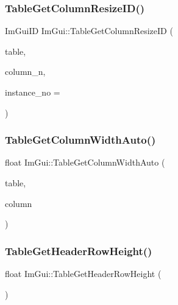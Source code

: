 \mbox{\label{namespaceImGui_afd429a61ae4e88f842031282a6430cd2}} 
\subsubsection{\texorpdfstring{Table\+Get\+Column\+Resize\+I\+D()}{TableGetColumnResizeID()}}
{\footnotesize\ttfamily Im\+Gui\+ID Im\+Gui\+::\+Table\+Get\+Column\+Resize\+ID (\begin{DoxyParamCaption}\item[{const \hyperlink{structImGuiTable}{Im\+Gui\+Table} $\ast$}]{table,  }\item[{int}]{column\+\_\+n,  }\item[{int}]{instance\+\_\+no = {} }\end{DoxyParamCaption})}

\mbox{\label{namespaceImGui_adb37a5d79b71507de590924cd53e1e62}} 
\subsubsection{\texorpdfstring{Table\+Get\+Column\+Width\+Auto()}{TableGetColumnWidthAuto()}}
{\footnotesize\ttfamily float Im\+Gui\+::\+Table\+Get\+Column\+Width\+Auto (\begin{DoxyParamCaption}\item[{\hyperlink{structImGuiTable}{Im\+Gui\+Table} $\ast$}]{table,  }\item[{\hyperlink{structImGuiTableColumn}{Im\+Gui\+Table\+Column} $\ast$}]{column }\end{DoxyParamCaption})}

\mbox{\label{namespaceImGui_a5be2ea5c0d97fdd02b0b776412ed9d8d}} 
\subsubsection{\texorpdfstring{Table\+Get\+Header\+Row\+Height()}{TableGetHeaderRowHeight()}}
{\footnotesize\ttfamily float Im\+Gui\+::\+Table\+Get\+Header\+Row\+Height (\begin{DoxyParamCaption}{ }\end{DoxyParamCaption})}


